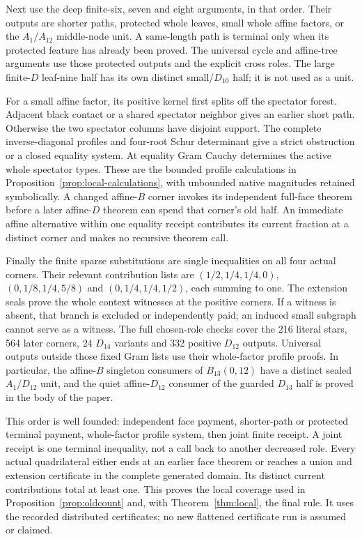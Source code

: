 \documentclass[11pt]{article}
\theoremstyle{remark}\newtheorem{remark}[theorem]{Remark}
\begin{document}
Next use the deep finite-six, seven and eight arguments, in that
order. Their outputs are shorter paths, protected whole leaves,
small whole affine factors, or the $A_1/A_{12}$ middle-node unit.
A same-length path is terminal only when its protected feature
has already been proved. The universal cycle and affine-tree
arguments use those protected outputs and the explicit cross roles.
The large finite-$D$ leaf-nine half has its own distinct small/$D_{10}$
half; it is not used as a unit.

For a small affine factor, its positive kernel first splits off
the spectator forest. Adjacent black contact or a shared spectator
neighbor gives an earlier short path. Otherwise the two spectator
columns have disjoint support. The complete inverse-diagonal
profiles and four-root Schur determinant give a strict obstruction
or a closed equality system. At equality Gram Cauchy determines
the active whole spectator types. These are the bounded profile
calculations in Proposition~\ref{prop:local-calculations}, with
unbounded native magnitudes retained symbolically. A changed
affine-$B$ corner invokes its independent full-face theorem before
a later affine-$D$ theorem can spend that corner's old half.
An immediate affine alternative within one equality receipt
contributes its current fraction at a distinct corner and makes
no recursive theorem call.

Finally the finite sparse substitutions are single inequalities
on all four actual corners. Their relevant contribution lists
are $(1/2,1/4,1/4,0)$, $(0,1/8,1/4,5/8)$ and
$(0,1/4,1/4,1/2)$, each summing to one. The extension seals
prove the whole context witnesses at the positive corners.
If a witness is absent, that branch is excluded or independently
paid; an induced small subgraph cannot serve as a witness.
The full chosen-role checks cover the 216 literal stars, 564
later corners, 24 $D_{14}$ variants and 332 positive $D_{12}$
outputs. Universal outputs outside those fixed Gram lists use
their whole-factor profile proofs. In particular, the affine-$B$
singleton consumers of $B_{13}(0,12)$ have a distinct sealed
$A_1/D_{12}$ unit, and the quiet affine-$D_{12}$ consumer of the
guarded $D_{13}$ half is proved in the body of the paper.

This order is well founded: independent face payment, shorter-path
or protected terminal payment, whole-factor profile system, then
joint finite receipt. A joint receipt is one terminal inequality,
not a call back to another decreased role. Every actual quadrilateral
either ends at an earlier face theorem or reaches a union and
extension certificate in the complete generated domain. Its
distinct current contributions total at least one. This proves
the local coverage used in Proposition~\ref{prop:oldcount} and,
with Theorem~\ref{thm:local}, the final rule. It uses the recorded
distributed certificates; no new flattened certificate run is
assumed or claimed.
\end{document}
